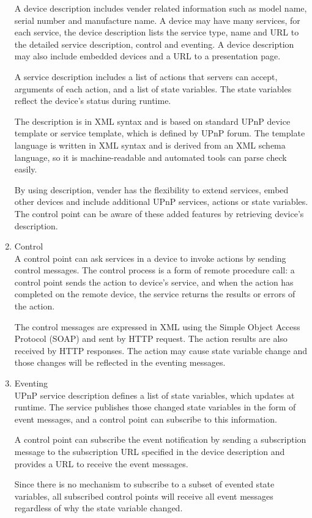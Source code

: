 \begin{enumerate}
A device description includes vender related information such as model name, serial number and 
manufacture name. A device may have many services, for each service, the device description lists 
the service type, name and URL to the detailed service description, control and eventing. A device 
description may also include embedded devices and a URL to a presentation page.

A service description includes a list of actions that servers can accept, arguments of each action, 
and a list of state variables. The state variables reflect the device's status during runtime.

The description is in XML syntax and is based on standard UPnP device template or service template, 
which is defined by UPnP forum. The template language is written in XML syntax and is derived from 
an XML schema language, so it is machine-readable and automated tools can parse check easily.

By using description, vender has the flexibility to extend services, embed other devices and include 
additional UPnP services, actions or state variables. The control point can be aware of these added 
features by retrieving device's description.
\item Control \\
A control point can ask services in a device to invoke actions by sending control messages. The control 
process is a form of remote procedure call: a control point sends the action to device's service, and 
when the action has completed on the remote device, the service returns the results or errors of the action.

The control messages are expressed in XML using the Simple Object Access Protocol (SOAP) and sent by 
HTTP request. The action results are also received by HTTP responses. The action may cause state variable 
change and those changes will be reflected in the eventing messages.
\item Eventing \\
UPnP service description defines a list of state variables, which updates at runtime. The service 
publishes those changed state variables in the form of event messages, and a control point can 
subscribe to this information.

A control point can subscribe the event notification by sending a subscription message to the 
subscription URL specified in the device description and provides a URL to receive the event messages.

Since there is no mechanism to subscribe to a subset of evented state variables, all subscribed 
control points will receive all event messages regardless of why the state variable changed. 


\end{enumerate}
